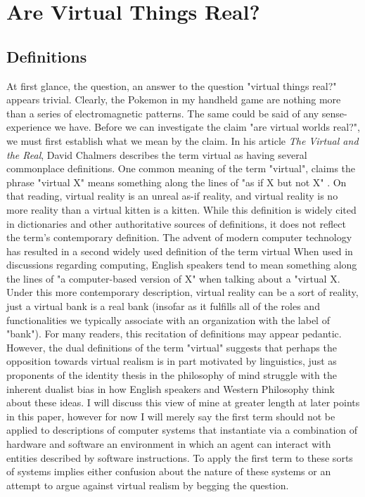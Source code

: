 \chapter{Are Virtual Things Real?}
\section{Definitions}
At first glance, the question, an answer to the question "virtual things real?" appears trivial. Clearly, the Pokemon in my handheld game are nothing more than a series of electromagnetic patterns. The same could be said of any sense-experience we have. 
Before we can investigate the claim "are virtual worlds real?", we must first establish what we mean by the claim. In his article \textit{The Virtual and the Real}, David Chalmers describes the term virtual as having several commonplace definitions. One common meaning of the term "virtual", claims the phrase "virtual X" means something along the lines of "as if X but not X" . On that reading, virtual reality is an unreal as-if reality, and virtual reality is no more reality than a virtual kitten is a kitten. \cite{ChalmersVR} While this definition is widely cited in dictionaries and other authoritative sources of definitions, it does not reflect the term’s contemporary definition. The advent of modern computer technology has resulted in a second widely used definition of the term virtual When used in discussions regarding computing, English speakers  tend to mean something along the lines of "a computer-based version of X" when talking about a "virtual X. Under this more contemporary description, virtual reality can be a sort of reality, just a virtual bank is a real bank (insofar as it fulfills all of the roles and functionalities we typically associate with an organization with the label of "bank"). 
For many readers, this recitation of definitions may appear pedantic. However, the dual definitions of the term "virtual" suggests that perhaps the opposition towards virtual realism is in part motivated by linguistics, just as proponents of the identity thesis in the philosophy of mind struggle with the inherent dualist bias in how English speakers and Western Philosophy think about these ideas. I will discuss this view of mine at greater length at later points in this paper, however for now I will merely say the first term should not be applied to descriptions of computer systems that instantiate via a combination of hardware and software an environment in which an agent can interact with entities described by software instructions. To apply the first term to these sorts of systems implies either confusion about the nature of these systems or an attempt to argue against virtual realism by begging the question. 
